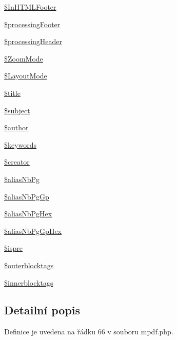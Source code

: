 \begin{DoxyCompactItemize}
\hyperlink{classm_p_d_f_a1f51c3f69f2168e9ac13adfbae24c805}{\$\-In\-H\-T\-M\-L\-Footer}
\item 
\hyperlink{classm_p_d_f_afa84c52e5a6371f847d0c3c9cc049453}{\$processing\-Footer}
\item 
\hyperlink{classm_p_d_f_ac5e4e20dfc535dc8a2fc31e8ebc0a5cc}{\$processing\-Header}
\item 
\hyperlink{classm_p_d_f_a9961567c10c8f40b7a34414ab8edebdf}{\$\-Zoom\-Mode}
\item 
\hyperlink{classm_p_d_f_a9a39d1f8fa5995cbd515d227827513c2}{\$\-Layout\-Mode}
\item 
\hyperlink{classm_p_d_f_ab93ef24a50b81977a88194562c525612}{\$title}
\item 
\hyperlink{classm_p_d_f_acaa4e9105b8adfeec3c522efb36546e7}{\$subject}
\item 
\hyperlink{classm_p_d_f_a3796ae6cd7b69f3b9e3acf5dc7094f12}{\$author}
\item 
\hyperlink{classm_p_d_f_a3089c13fc620ae6a08899c1e764662d6}{\$keywords}
\item 
\hyperlink{classm_p_d_f_a182e5a7fbae258fa800bbf98298b2f8a}{\$creator}
\item 
\hyperlink{classm_p_d_f_a4cb42bda8a3f4c96b899ad85ce2b849c}{\$alias\-Nb\-Pg}
\item 
\hyperlink{classm_p_d_f_a2876b7c1214ab4c13f3a57feafe7d990}{\$alias\-Nb\-Pg\-Gp}
\item 
\hyperlink{classm_p_d_f_a6b869b54dad9003d814aea0122b9f66f}{\$alias\-Nb\-Pg\-Hex}
\item 
\hyperlink{classm_p_d_f_a3c910ff70fb123eeb47494a205f3edaf}{\$alias\-Nb\-Pg\-Gp\-Hex}
\item 
\hyperlink{classm_p_d_f_af496ecfe6223c99aaf9c694a1544aa6b}{\$ispre}
\item 
\hyperlink{classm_p_d_f_a41948086171d1cf8bc9a331cc2c86b6e}{\$outerblocktags}
\item 
\hyperlink{classm_p_d_f_ab5505ebe867ac16aae7d6ecd07584a51}{\$innerblocktags}
\end{DoxyCompactItemize}


\subsection{Detailní popis}


Definice je uvedena na řádku 66 v souboru mpdf.\-php.



